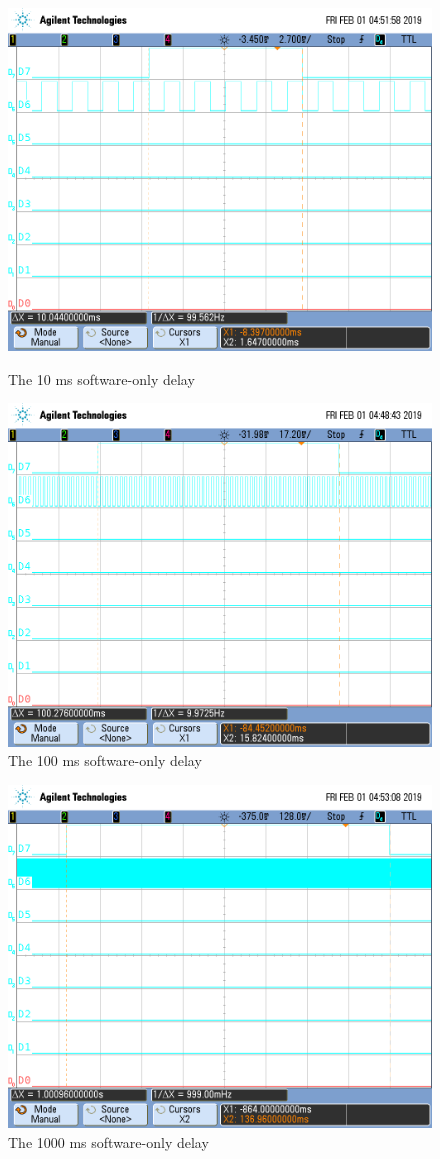 \documentclass[a4paper, 12pt]{article}
\begin{document}
\begin{figure}[p]
\centering
\includegraphics[width=.8\textwidth]{10ms_software.png}
\caption{The 10 ms software-only delay}
\includegraphics[width=.8\textwidth]{100ms_software.png}
\caption{The 100 ms software-only delay}
\end{figure}

\begin{figure}[htp]
\centering
\includegraphics[width=.8\textwidth]{1000ms_software.png}
\caption{The 1000 ms software-only delay}
\end{figure}
\end{document}
